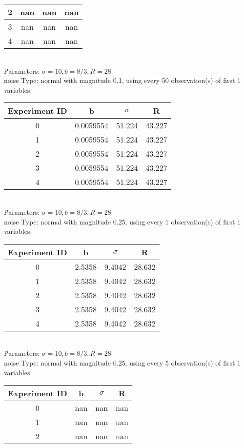 \begin{multicols}{3}
\begin{tabular}{cccc}
 2 & nan & nan & nan\\ \hline 
 3 & nan & nan & nan\\ \hline 
 4 & nan & nan & nan\\ \hline 
 \end{tabular}\\
Parameters: $\sigma=10, b=8/3, R=28$\\
noise Type: normal with magnitude 0.1, using every 50 observation(s) of first 1 variables.\\
\begin{tabular}{cccc}
\hline Experiment ID & b & $\sigma$ & R \\ \hline 
0 & 0.0059554 & 51.224 & 43.227\\ \hline 
 1 & 0.0059554 & 51.224 & 43.227\\ \hline 
 2 & 0.0059554 & 51.224 & 43.227\\ \hline 
 3 & 0.0059554 & 51.224 & 43.227\\ \hline 
 4 & 0.0059554 & 51.224 & 43.227\\ \hline 
 \end{tabular}\\
Parameters: $\sigma=10, b=8/3, R=28$\\
noise Type: normal with magnitude 0.25, using every 1 observation(s) of first 1 variables.\\
\begin{tabular}{cccc}
\hline Experiment ID & b & $\sigma$ & R \\ \hline 
0 & 2.5358 & 9.4042 & 28.632\\ \hline 
 1 & 2.5358 & 9.4042 & 28.632\\ \hline 
 2 & 2.5358 & 9.4042 & 28.632\\ \hline 
 3 & 2.5358 & 9.4042 & 28.632\\ \hline 
 4 & 2.5358 & 9.4042 & 28.632\\ \hline 
 \end{tabular}\\
Parameters: $\sigma=10, b=8/3, R=28$\\
noise Type: normal with magnitude 0.25, using every 5 observation(s) of first 1 variables.\\
\begin{tabular}{cccc}
\hline Experiment ID & b & $\sigma$ & R \\ \hline 
0 & nan & nan & nan\\ \hline 
 1 & nan & nan & nan\\ \hline 
 2 & nan & nan & nan\\ \hline 

\end{tabular}
\end{multicols}
